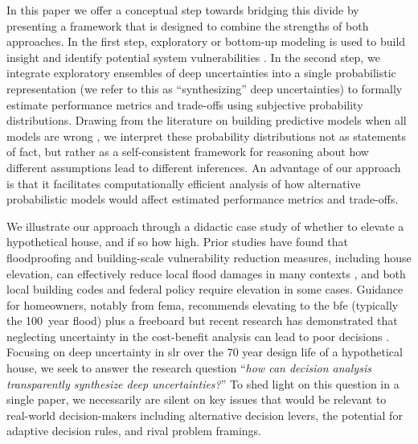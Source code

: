\documentclass{agujournal2019}
\begin{document}
In this paper we offer a conceptual step towards bridging this divide by presenting a framework that is designed to combine the strengths of both approaches.
In the first step, exploratory or bottom-up modeling is used to build insight and identify potential system vulnerabilities \cite{moallemi_exploratory:2020,bankes:1993,brown_decisionscaling:2012}.
In the second step, we integrate exploratory ensembles of deep uncertainties into a single probabilistic representation (we refer to this as ``synthesizing'' deep uncertainties) to formally estimate performance metrics and trade-offs using subjective probability distributions.
Drawing from the literature on building predictive models when all models are wrong \cite{box_sciencestatistics:1976,gelman_philosophy:2013,Piironen:2017eh}, we interpret these probability distributions not as statements of fact, but rather as a self-consistent framework for reasoning about how different assumptions lead to different inferences.
An advantage of our approach is that it facilitates computationally efficient analysis of how alternative probabilistic models would affect estimated performance metrics and trade-offs.

We illustrate our approach through a didactic case study of whether to elevate a hypothetical house, and if so how high.
Prior studies have found that floodproofing and building-scale vulnerability reduction measures, including house elevation, can effectively reduce local flood damages in many contexts \cite{demoel_reducing:2014,deruig_building:2020,kreibich_building:2005,slotter_floodproofing:2020,rozer_coping:2016,mobley_mitigation:2020,aerts_cost:2018}, and both local building codes \cite{asce_7-10:2013,bruneau_multihazard:2017,asce_24-05:2006} and federal policy \cite{FEMA_p-55:2011} require elevation in some cases.
Guidance for homeowners, notably from \gls{fema}, recommends elevating to the \gls{bfe} (typically the \SI{100}{year} flood) plus a freeboard \cite{fema_retrofitting:2014,asce_24-14:2015,fema_retrofitting:2014} but recent research has demonstrated that neglecting uncertainty in the cost-benefit analysis can lead to poor decisions \cite{zarekarizi_suboptimal:2020}.
Focusing on deep uncertainty in \gls{slr} over the 70 year design life of a hypothetical house, we seek to answer the research question ``\emph{how can decision analysis transparently synthesize deep uncertainties?}''
To shed light on this question in a single paper, we necessarily are silent on key issues that would be relevant to real-world decision-makers including alternative decision levers, the potential for adaptive decision rules, and rival problem framings.
\end{document}
